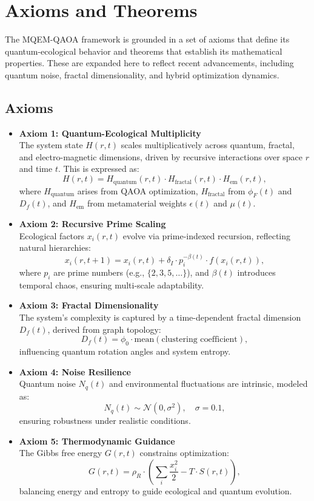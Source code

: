 \documentclass{article}
\theoremstyle{plain}
\begin{document}
\section{Axioms and Theorems}
The MQEM-QAOA framework is grounded in a set of axioms that define its quantum-ecological behavior and theorems that establish its mathematical properties. These are expanded here to reflect recent advancements, including quantum noise, fractal dimensionality, and hybrid optimization dynamics.

\subsection{Axioms}
\begin{itemize}
    \item \textbf{Axiom 1: Quantum-Ecological Multiplicity} \\
    The system state \( H(r,t) \) scales multiplicatively across quantum, fractal, and electro-magnetic dimensions, driven by recursive interactions over space \( r \) and time \( t \). This is expressed as:
    \[
    H(r,t) = H_{\text{quantum}}(r,t) \cdot H_{\text{fractal}}(r,t) \cdot H_{\text{em}}(r,t),
    \]
    where \( H_{\text{quantum}} \) arises from QAOA optimization, \( H_{\text{fractal}} \) from \( \phi_F(t) \) and \( D_f(t) \), and \( H_{\text{em}} \) from metamaterial weights \( \epsilon(t) \) and \( \mu(t) \).

    \item \textbf{Axiom 2: Recursive Prime Scaling} \\
    Ecological factors \( x_i(r,t) \) evolve via prime-indexed recursion, reflecting natural hierarchies:
    \[
    x_i(r,t+1) = x_i(r,t) + \delta_I \cdot p_i^{-\beta(t)} \cdot f(x_i(r,t)),
    \]
    where \( p_i \) are prime numbers (e.g., \( \{2, 3, 5, \ldots\} \)), and \( \beta(t) \) introduces temporal chaos, ensuring multi-scale adaptability.

    \item \textbf{Axiom 3: Fractal Dimensionality} \\
    The system’s complexity is captured by a time-dependent fractal dimension \( D_f(t) \), derived from graph topology:
    \[
    D_f(t) = \phi_0 \cdot \text{mean}(\text{clustering coefficient}),
    \]
    influencing quantum rotation angles and system entropy.

    \item \textbf{Axiom 4: Noise Resilience} \\
    Quantum noise \( N_q(t) \) and environmental fluctuations are intrinsic, modeled as:
    \[
    N_q(t) \sim \mathcal{N}(0, \sigma^2), \quad \sigma = 0.1,
    \]
    ensuring robustness under realistic conditions.

    \item \textbf{Axiom 5: Thermodynamic Guidance} \\
    The Gibbs free energy \( G(r,t) \) constrains optimization:
    \[
    G(r,t) = \rho_R \cdot \left( \sum_i \frac{x_i^2}{2} - T \cdot S(r,t) \right),
    \]
    balancing energy and entropy to guide ecological and quantum evolution.
\end{itemize}
\end{document}
